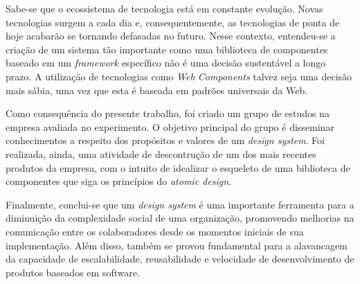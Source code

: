 Sabe-se que o ecossistema de tecnologia está em constante evolução. Novas tecnologias surgem a cada dia e, consequentemente, as tecnologias de ponta de hoje acabarão se tornando defasadas no futuro. Nesse contexto, entendeu-se a criação de um sistema tão importante como uma biblioteca de componentes baseado em um \textit{framework} específico não é uma decisão sustentável a longo prazo. A utilização de tecnologias como \textit{Web Components} talvez seja uma decisão mais sábia, uma vez que esta é baseada em padrões universais da Web.

Como consequência do presente trabalho, foi criado um grupo de estudos na empresa avaliada no experimento. O objetivo principal do grupo é disseminar conhecimentos a respeito dos propósitos e valores de um \textit{design system}. Foi realizada, ainda, uma atividade de descontrução de um dos mais recentes produtos da empresa, com o intuito de idealizar o esqueleto de uma biblioteca de componentes que siga os princípios do \textit{atomic design}.

Finalmente, conclui-se que um \textit{design system} é uma importante ferramenta para a diminuição da complexidade social de uma organização, promovendo melhorias na comunicação entre os colaboradores desde os momentos iniciais de sua implementação. Além disso, também se provou fundamental para a alavancagem da capacidade de escalabilidade, reusabilidade e velocidade de desenvolvimento de produtos baseados em software.
